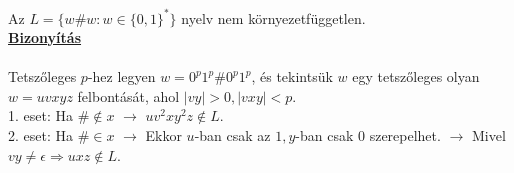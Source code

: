 \documentclass{beamer}
\newcommand{\msmallskip}{\vspace{0.3em}}
\newcommand{\mmedskip}{\vspace{0.5em}}
\newcommand{\mbigskip}{\vspace{1em}}
\begin{document}
\begin{frame}
\begin{tcolorbox}[title={Tétel: Példa nem környezetfüggetlen nyelvre 2}]
Az $L = \{w\#w : w \in \{0, 1\}^* \}$ nyelv nem környezetfüggetlen.\\
\tcblower
\msmallskip
\underline{\textbf{Bizonyítás}}\\
\mmedskip
\\
Tetszőleges $p$-hez legyen $w = 0^p1^p\#0^p1^p$, és tekintsük $w$ egy tetszőleges olyan $w = uvxyz$ felbontását, ahol $|vy| > 0, |vxy| < p$.\\
\mbigskip
1. eset: Ha $\# \notin x$ $\rightarrow$ $uv^2xy^2z \notin L$.\\
\mbigskip
2. eset: Ha $\# \in x$ $\rightarrow$ Ekkor $u$-ban csak az $1, y$-ban csak $0$ szerepelhet. $\rightarrow$ Mivel $vy \neq \epsilon \Rightarrow uxz \notin L$.
\end{tcolorbox}
\end{frame}
\end{document}
